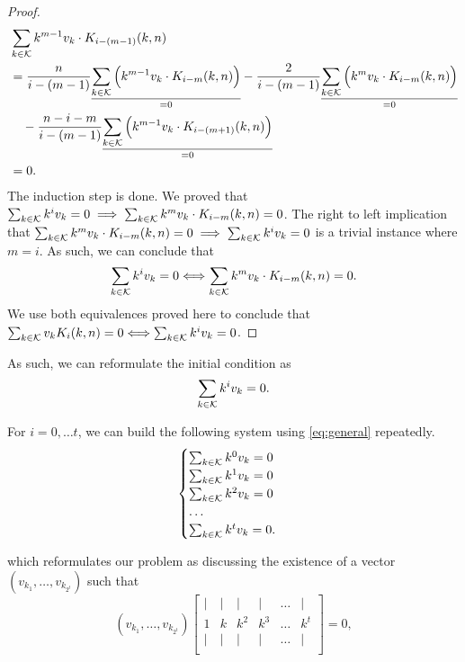 \begin{proof}
    \begin{equation*}
        \begin{split}
            & \sum_{k \in \mathcal{K}} k^{m-1}v_k \cdot K_{i-(m-1)}(k,n)\\
            &= \frac{n}{i-(m-1)}\underset{=0}{\underline{\sum_{k \in \mathcal{K}} \Big(k^{m-1}v_k\cdot K_{i-m}(k,n) \Big)}} - \frac{2}{i-(m-1)}\underset{=0}{\underline{\sum_{k \in \mathcal{K}} \Big(k^mv_k\cdot K_{i-m}(k,n)\Big)}}\\
            &\quad -\frac{n-i-m}{i-(m-1)}\underset{=0}{\underline{\sum_{k \in \mathcal{K}}\Big(k^{m-1}v_k\cdot K_{i-(m+1)}(k,n)\Big)}}\\
            &= 0.
        \end{split}
    \end{equation*}
    The induction step is done. We proved that $\sum_{k \in \mathcal{K}} k^iv_k = 0 \implies \sum_{k \in \mathcal{K}} k^mv_k\cdot K_{i-m}(k,n) = 0$.
    The right to left implication that $\sum_{k \in \mathcal{K}} k^mv_k \cdot K_{i-m}(k, n) = 0 \implies \sum_{k \in \mathcal{K}} k^iv_k = 0$ is a trivial instance where $m = i$. As such, we can conclude that
    $$\sum_{k \in \mathcal{K}} k^iv_k = 0 \Longleftrightarrow \sum_{k \in \mathcal{K}} k^mv_k \cdot K_{i-m}(k, n) = 0.$$
    We use both equivalences proved here to conclude that $\sum_{k \in \mathcal{K}} v_kK_i(k,n) = 0 \Longleftrightarrow \sum_{k \in \mathcal{K}} k^iv_k = 0$.
\end{proof}


As such, we can reformulate the initial condition as
\begin{equation}\label{eq:general}
    \sum_{k \in \mathcal{K}} k^iv_k = 0.
\end{equation}

For $i = 0, \ldots t$, we can build the following system using \cref{eq:general} repeatedly.
\begin{equation}
    \begin{cases}
        \sum_{k \in \mathcal{K}} k^0v_k = 0\\
        \sum_{k \in \mathcal{K}} k^1v_k = 0\\
        \sum_{k \in \mathcal{K}} k^2v_k = 0\\
        \ldots\\
        \sum_{k \in \mathcal{K}} k^tv_k = 0.\\
    \end{cases}
\end{equation}

which reformulates our problem as discussing the existence of a vector $(v_{k_1}, \ldots, v_{k_{2^t}})$ such that
$$
(v_{k_1}, \ldots, v_{k_{2^t}})
\begin{bmatrix}
    | & | & | & | & \ldots & |\\
    1 & k & k^2 & k^3 & \ldots & k^t\\
    | & | & | & | & \ldots & |\\
\end{bmatrix} = 0,
$$

